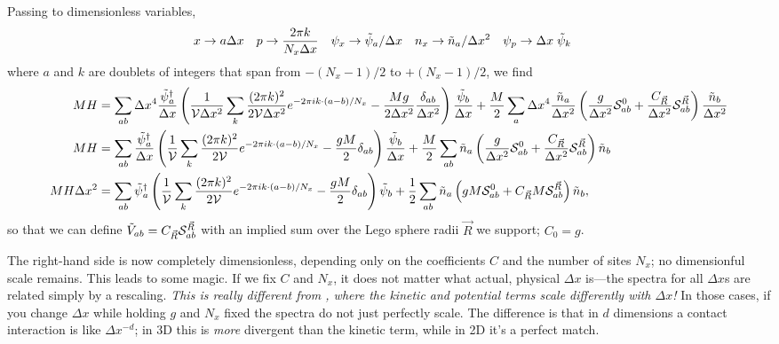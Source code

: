 Passing to dimensionless variables,
\begin{align}
	x & \rightarrow a \Delta x
	&
	p &\rightarrow \frac{2\pi k}{N_x \Delta x}
	&
	\psi_x & \rightarrow \tilde{\psi}_a / \Delta x
	&
	n_x &\rightarrow \tilde{n}_a / \Delta x^2
	&
	\psi_p & \rightarrow \Delta x \; \tilde{\psi}_k
\end{align}
where $a$ and $k$ are doublets of integers that span from $-(N_x-1)/2$ to $+(N_x-1)/2$, we find
\begin{align}
	MH &= 
		\sum_{ab}\Delta x^4 \frac{\tilde{\psi}{}^{\dagger}_a}{\Delta x} \left(
				\frac{1}{\mathcal{V} \Delta x^2} \sum_{k} \frac{(2\pi k)^2}{2 \mathcal{V} \Delta x^2} e^{-2\pi i k \cdot(a-b)/N_x} 
				- \frac{Mg}{2\Delta x^2} \frac{\delta_{ab}}{\Delta x^2}
			\right) \frac{\tilde{\psi}_b}{\Delta x}
		+ \frac{M}{2} \sum_{a} \Delta x^4 \frac{\tilde{n}_a}{\Delta x^2} \left(
				\frac{g}{\Delta x^2} \mathcal{S}^{0}_{ab}
				+ \frac{C_{\vec{R}}}{\Delta x^2} \mathcal{S}^{\vec{R}}_{ab}
			\right) \frac{\tilde{n}_b}{\Delta x^2}
	\\
	MH &=
		\sum_{ab}\frac{\tilde{\psi}{}^{\dagger}_a}{\Delta x} \left(
			\frac{1}{\mathcal{V}} \sum_{k} \frac{(2\pi k)^2}{2 \mathcal{V}} e^{-2\pi i k \cdot(a-b)/N_x} 
			- \frac{gM}{2} \delta_{ab}
			\right) \frac{\tilde{\psi}_b}{\Delta x}
		+ \frac{M}{2} \sum_{ab} \tilde{n}_a \left(
				\frac{g}{\Delta x^2} \mathcal{S}^{0}_{ab}
				+ \frac{C_{\vec{R}}}{\Delta x^2} \mathcal{S}^{\vec{R}}_{ab}
			\right) \tilde{n}_b
	\\
	MH \Delta x^2 &=
		\sum_{ab} \tilde{\psi}{}^{\dagger}_a \left(
			\frac{1}{\mathcal{V}} \sum_{k} \frac{(2\pi k)^2}{2 \mathcal{V}} e^{-2\pi i k \cdot(a-b)/N_x} 
			- \frac{gM}{2} \delta_{ab}
			\right) \tilde{\psi}_b
		+ \frac{1}{2} \sum_{ab} \tilde{n}_a \left(
				gM \mathcal{S}^{0}_{ab}
				+ C_{\vec{R}} M \mathcal{S}^{\vec{R}}_{ab}
			\right) \tilde{n}_b,
\end{align}
so that we can define $\tilde{V}_{ab} = C_{\vec{R}} \mathcal{S}^{\vec{R}}_{ab}$ with an implied sum over the Lego sphere radii $\vec{R}$ we support; $C_0 = g$.

The right-hand side is now completely dimensionless, depending only on the coefficients $C$ and the number of sites $N_x$; no dimensionful scale remains.
This leads to some magic.
If we fix $C$ and $N_x$, it does not matter what actual, physical $\Delta x$ is---the spectra for all $\Delta x$s are related simply by a rescaling.
\emph{This is really different from , where the kinetic and potential terms scale differently with $\Delta x$!}
In those cases, if you change $\Delta x$ while holding $g$ and $N_x$ fixed the spectra do not just perfectly scale.
The difference is that in $d$ dimensions a contact interaction is like $\Delta x^{-d}$; in 3D this is \emph{more} divergent than the kinetic term, while in 2D it's a perfect match.

